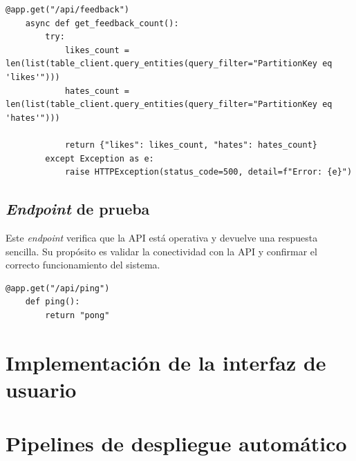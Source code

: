 \begin{lstlisting}[label=cod:api-3,caption=\textit{Endpoint} de consulta de opiniones.]
	@app.get("/api/feedback")
	async def get_feedback_count():
		try:
			likes_count = len(list(table_client.query_entities(query_filter="PartitionKey eq 'likes'")))
			hates_count = len(list(table_client.query_entities(query_filter="PartitionKey eq 'hates'")))
	
			return {"likes": likes_count, "hates": hates_count}
		except Exception as e:
			raise HTTPException(status_code=500, detail=f"Error: {e}")	
\end{lstlisting}

\subsection{\textit{Endpoint} de prueba}

Este \textit{endpoint} verifica que la API está operativa y devuelve una respuesta sencilla. Su propósito es 
validar la conectividad con la API y confirmar el correcto funcionamiento del sistema.

\begin{lstlisting}[label=cod:api-4,caption=\textit{Endpoint} de prueba.]
	@app.get("/api/ping")
	def ping():
		return "pong"
\end{lstlisting}

\section{Implementación de la interfaz de usuario}

\section{Pipelines de despliegue automático}